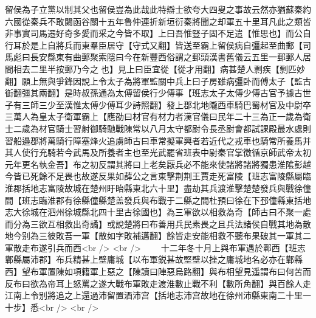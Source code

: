留侯為子立黨以制其父也留侯豈為此哉此特辯士欲夸大四叟之事故云然亦猶蘇秦約六國從秦兵不敢闚函谷關十五年魯仲連折新垣衍秦將聞之却軍五十里耳凡此之類皆非事實司馬遷好奇多愛而采之今皆不取】上曰吾惟豎子固不足遣【惟思也】而公自行耳於是上自將兵而東羣臣居守【守式又翻】皆送至霸上留侯病自彊起至曲郵【司馬彪曰長安縣東有曲郵聚索隱曰今在新豐西俗謂之郵頭漢書舊儀云五里一郵郵人居間相去二里半按郵乃今之也】見上曰臣宜從【從才用翻】病甚楚人剽疾【剽匹妙翻】願上無與爭鋒因說上令太子為將軍監關中兵上曰子房雖病彊卧而傅太子【監古衘翻彊其兩翻】是時叔孫通為太傅留侯行少傅事【班志太子太傅少傅古官予據古世子有三師三少至漢惟太傅少傅耳少詩照翻】發上郡北地隴西車騎巴蜀材官及中尉卒三萬人為皇太子衛軍霸上【應劭曰材官有材力者漢官儀曰民年二十三為正一歲為衛士二歲為材官騎士習射御騎馳戰陳常以八月太守都尉令長丞尉會都試課殿最水處則習船邉郡將萬騎行障塞烽火追虜師古曰車常擬軍興者若近代之戎車也騎常所養馬并其人使行充騎若今武馬及所養者主也至光武罷省班表中尉秦官掌徼循京師武帝太初元年更名執金吾】布之初反謂其將曰上老矣厭兵必不能來使諸將諸將獨患淮隂彭越今皆已死餘不足畏也故遂反果如薛公之言東擊荆荆王賈走死富陵【班志富陵縣屬臨淮郡括地志富陵故城在楚州盱眙縣東北六十里】盡劫其兵渡淮擊楚楚發兵與戰徐僮間【班志臨淮郡有徐縣僮縣楚盖發兵與布戰于二縣之間杜預曰徐在下邳僮縣東括地志大徐城在泗州徐城縣北四十里古徐國也】為三軍欲以相救為奇【師古曰不聚一處而分為三欲互相救出奇譎】或說楚將曰布善用兵民素畏之且兵法諸侯自戰其地為散地今别為三彼敗吾一軍【散如字敗補邁翻】餘皆走安能相救不聽布果破其一軍其二軍散走布遂引兵而西<br />
<br />
　　十二年冬十月上與布軍遇於鄿西【班志鄿縣屬沛郡】布兵精甚上壁庸城【以布軍鋭甚故堅壁以挫之庸城地名必亦在鄿縣西】望布軍置陳如項籍軍上惡之【陳讀曰陣惡烏路翻】與布相望見遥謂布曰何苦而反布曰欲為帝耳上怒罵之遂大戰布軍敗走渡淮數止戰不利【數所角翻】與百餘人走江南上令别將追之上還過沛留置酒沛宫【括地志沛宫故地在徐州沛縣東南二十里一十步】悉<br />
<br />
